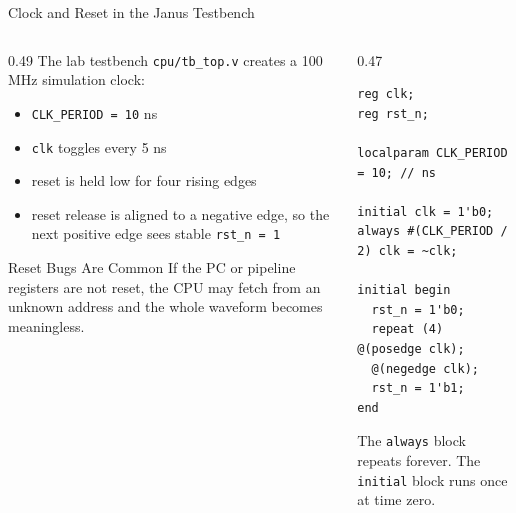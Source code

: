 \documentclass[aspectratio=169,10pt]{beamer}
\begin{document}
\begin{frame}[fragile]{Clock and Reset in the Janus Testbench}
  \begin{columns}[T]
    \begin{column}{0.49\textwidth}
      The lab testbench \texttt{cpu/tb\_top.v} creates a 100 MHz simulation clock:

      \vspace{0.7em}
      \begin{itemize}
        \item \texttt{CLK\_PERIOD = 10} ns
        \item \texttt{clk} toggles every 5 ns
        \item reset is held low for four rising edges
        \item reset release is aligned to a negative edge, so the next positive edge sees stable \texttt{rst\_n = 1}
      \end{itemize}

      \vspace{0.7em}
      \begin{alertblock}{Reset Bugs Are Common}
        If the PC or pipeline registers are not reset, the CPU may fetch from an unknown address and the whole waveform becomes meaningless.
      \end{alertblock}
    \end{column}
    \begin{column}{0.47\textwidth}
\begin{lstlisting}
reg clk;
reg rst_n;

localparam CLK_PERIOD = 10; // ns

initial clk = 1'b0;
always #(CLK_PERIOD / 2) clk = ~clk;

initial begin
  rst_n = 1'b0;
  repeat (4) @(posedge clk);
  @(negedge clk);
  rst_n = 1'b1;
end
\end{lstlisting}
      \vspace{0.4em}
      \small
      The \texttt{always} block repeats forever. The \texttt{initial} block runs once at time zero.
    \end{column}
  \end{columns}
\end{frame}
\end{document}
